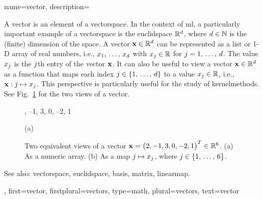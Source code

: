 {name={vector},
	description={A vector is an element of a \gls{vectorspace}. 
		In the context of \gls{ml}, a particularly important example of a \gls{vectorspace} 
		is the \gls{euclidspace} $\mathbb{R}^{d}$, where $d \in \mathbb{N}$ 
		is the (finite) \gls{dimension} of the space. A vector ${\bf x} \in \mathbb{R}^{d}$ 
		can be represented as a list or 1-D array of real numbers, i.e., 
		$x_1, \,\ldots, \,x_{d}$ with $x_j \in \mathbb{R}$ for 
		$j = 1, \,\ldots, \,d$. The value $x_j$ is the $j$th 
		entry of the vector ${\bf x}$. It can also be useful to view a vector ${\bf x} \in \mathbb{R}^{d}$ 
		as a \gls{function} that maps each index $j \in \{1, \,\ldots, \,d\}$ 
		to a value $x_j \in \mathbb{R}$, i.e., ${\bf x}: j \mapsto x_j$. 
		This perspective is particularly useful for the study of \glspl{kernelmethod}. See Fig.\ 
		\ref{fig:vector-function-dual_dict} for the two views of a vector.
		\begin{figure}[H]
			\begin{minipage}[c]{0.48\textwidth}
				, --1, 3, 0, --2, 1
				\begin{minipage}{\textwidth}
				\vspace{5ex}
				\centering
				{\selectfont (a)}
				\end{minipage}
			\end{minipage}
			\hfill
			\begin{minipage}{0.48\textwidth}
			\centering
			\end{minipage}
		\caption{Two equivalent views of a vector ${\bf x}= \big( 2, -1, 3, 0, -2, 1 \big)^{T} \in \mathbb{R}^{6}$.
			(a) As a numeric array. (b) As a \gls{map} $j \mapsto x_j$, where
			$j \in \{1, \,\dots, \,6\}$.}
			\label{fig:vector-function-dual_dict}
		\end{figure}
		See also: \gls{vectorspace}, \gls{euclidspace}, \gls{basis}, \gls{matrix}, \gls{linearmap}.},
	first={vector},
	firstplural={vectors},
	type=math,
	plural={vectors},
	text={vector}
}

